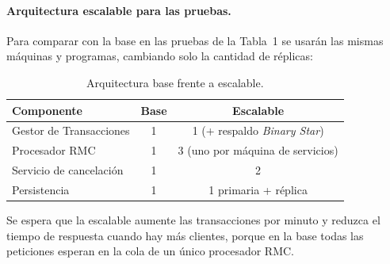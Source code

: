 \paragraph{Arquitectura escalable para las pruebas.} Para comparar con la base en
las pruebas de la Tabla~1 se usarán las mismas máquinas y programas, cambiando solo
la cantidad de réplicas:

\begin{table}[H]
\centering
\caption{Arquitectura base frente a escalable.}
\begin{tabular}{lcc}
\toprule
Componente & Base & Escalable \\
\midrule
Gestor de Transacciones & 1 & 1 (+ respaldo \emph{Binary Star}) \\
Procesador RMC & 1 & 3 (uno por máquina de servicios) \\
Servicio de cancelación & 1 & 2 \\
Persistencia & 1 & 1 primaria + réplica \\
\bottomrule
\end{tabular}
\end{table}

Se espera que la escalable aumente las transacciones por minuto y reduzca el
tiempo de respuesta cuando hay más clientes, porque en la base todas las
peticiones esperan en la cola de un único procesador RMC.
